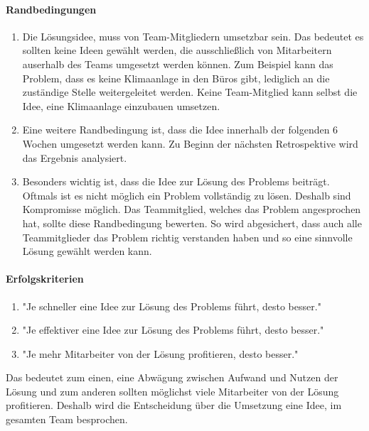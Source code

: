 \paragraph{Randbedingungen}
\begin{enumerate}
    \item Die Lösungsidee, muss von Team-Mitgliedern umsetzbar sein. Das bedeutet es sollten keine Ideen gewählt werden, die ausschließlich von Mitarbeitern auserhalb des Teams
    umgesetzt werden können. Zum Beispiel kann das Problem, dass es keine Klimaanlage in den Büros gibt, lediglich an die zuständige Stelle weitergeleitet werden.
    Keine Team-Mitglied kann selbst die Idee, eine Klimaanlage einzubauen umsetzen. 
    \item Eine weitere Randbedingung ist, dass die Idee innerhalb der folgenden 6 Wochen umgesetzt werden kann. Zu Beginn der 
    nächsten Retrospektive wird das Ergebnis analysiert.
    \item Besonders wichtig ist, dass die Idee zur Lösung des Problems beiträgt. Oftmals ist es nicht möglich ein Problem vollständig zu lösen. 
    Deshalb sind Kompromisse möglich. Das Teammitglied, welches das Problem angesprochen hat, sollte diese Randbedingung bewerten. So 
    wird abgesichert, dass auch alle Teammitglieder das Problem richtig verstanden haben und so eine sinnvolle Lösung gewählt werden kann. 
\end{enumerate}

\paragraph{Erfolgskriterien}
\begin{enumerate}
    \item "Je schneller eine Idee zur Lösung des Problems führt, desto besser." 
    \item "Je effektiver eine Idee zur Lösung des Problems führt, desto besser."
    \item "Je mehr Mitarbeiter von der Lösung profitieren, desto besser."
\end{enumerate}

Das bedeutet zum einen, eine Abwägung zwischen Aufwand und Nutzen der Lösung und zum anderen sollten möglichst viele Mitarbeiter 
von der Lösung profitieren. Deshalb wird die Entscheidung über die Umsetzung eine Idee, im gesamten Team besprochen. 